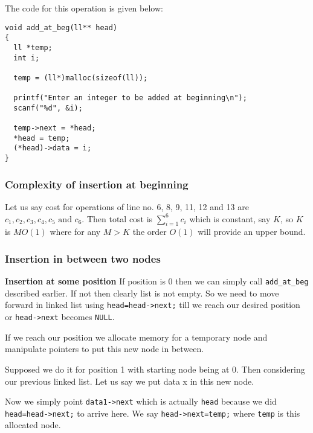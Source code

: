 \documentclass[aspectratio=1610]{beamer}
\begin{document}
\begin{frame}[fragile]
\begin{center}
\end{center}
The code for this operation is given below:
\begin{verbatim}
void add_at_beg(ll** head)
{
  ll *temp;
  int i;

  temp = (ll*)malloc(sizeof(ll));

  printf("Enter an integer to be added at beginning\n");
  scanf("%d", &i);

  temp->next = *head;
  *head = temp;
  (*head)->data = i;
}
\end{verbatim}
\end{frame}
\begin{frame}
\frametitle{Complexity of insertion at beginning}
Let us say cost for operations of line no. 6, 8, 9, 11, 12 and 13 are
$c_1, c_2, c_3, c_4, c_5 \text{ and } c_6$. Then total cost is
$\sum_{i=1}^6 c_i$ which is constant, say $K$, so $K$ is $MO(1)$ where
for any $M>K$ the order $O(1)$ will provide an upper bound.

\end{frame}

\begin{frame}
\frametitle{Insertion in between two nodes}
\textbf{Insertion at some position}
If position is 0 then we can simply call \texttt{add\_at\_beg} described
earlier. If not then clearly list is not empty. So we need to move forward
in linked list using \texttt{head=head->next;} till we reach our desired
position or \texttt{head->next} becomes \texttt{NULL}.

If we reach our position we allocate memory for a temporary node and
manipulate pointers to put this new node in between.

Supposed we do it for position 1 with starting node being at 0. Then
considering our previous linked list. Let us say we put data x in this
new node.
\begin{center}
\end{center}
Now we simply point \texttt{data1->next} which is actually
\texttt{head} because we did \texttt{head=head->next;} to arrive
here. We say \texttt{head->next=temp;} where \texttt{temp} is
this allocated node.
\end{frame}
\end{document}
